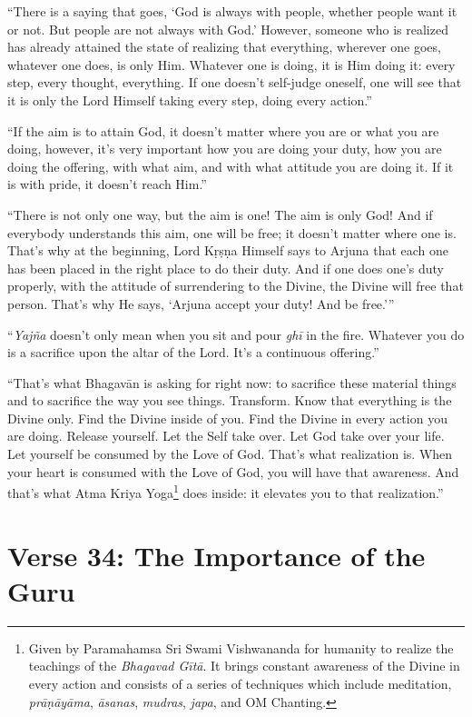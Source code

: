 \documentclass[12pt, twoside, openright]{memoir}
\begin{document}
\enquote{There is a saying that goes, \enquote{God is always with people, whether people want it or not. But people are not always with God.} However, someone who is realized has already attained the state of realizing that everything, wherever one goes, whatever one does, is only Him. Whatever one is doing, it is Him doing it: every step, every thought, everything. If one doesn’t self-judge oneself, one will see that it is only the Lord Himself taking every step, doing every action.}

\enquote{If the aim is to attain God, it doesn’t matter where you are or what you are doing, however, it’s very important how you are doing your duty, how you are doing the offering, with what aim, and with what attitude you are doing it. If it is with pride, it doesn’t reach Him.}

\enquote{There is not only one way, but the aim is one! The aim is only God! And if everybody understands this aim, one will be free; it doesn’t matter where one is. That’s why at the beginning, Lord Kṛṣṇa Himself says to Arjuna that each one has been placed in the right place to do their duty. And if one does one’s duty properly, with the attitude of surrendering to the Divine, the Divine will free that person. That’s why He says, \enquote{Arjuna accept your duty! And be free.}}

\enquote{\textit{Yajña} doesn’t only mean when you sit and pour \textit{ghī} in the fire. Whatever you do is a sacrifice upon the altar of the Lord. It’s a continuous offering.}

\enquote{That’s what Bhagavān is asking for right now: to sacrifice these material things and to sacrifice the way you see things. Transform. Know that everything is the Divine only. Find the Divine inside of you. Find the Divine in every action you are doing. Release yourself. Let the Self take over. Let God take over your life. Let yourself be consumed by the Love of God. That’s what realization is. When your heart is consumed with the Love of God, you will have that awareness. And that’s what Atma Kriya Yoga\footnote{Given by Paramahamsa Sri Swami Vishwananda for humanity to realize the teachings of the \textit{Bhagavad Gītā}. It brings constant awareness of the Divine in every action and consists of a series of techniques which include meditation, \textit{prāṇāyāma}, \textit{āsanas}, \textit{mudras}, \textit{japa}, and OM Chanting.} does inside: it elevates you to that realization.}

\section{Verse 34: The Importance of the Guru}\label{sec-verse-34-the-importance-of-the-guru}
\end{document}
